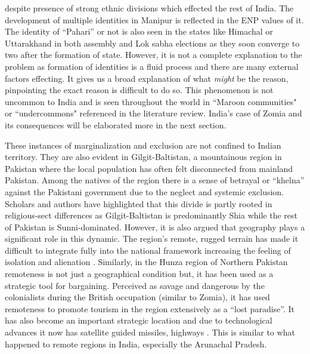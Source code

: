 despite presence of strong ethnic divisions which effected the rest of India. 
The development of multiple identities in Manipur is reflected in the ENP values of it. The identity of ``Pahari'' or not is also seen in the states like Himachal or Uttarakhand in both assembly and Lok sabha elections as they soon converge to two after the formation of state. However, it is not a complete explanation to the problem as formation of identities is a fluid process and there are many external factors effecting. It gives us a broad explanation of what \textit{might} be the reason, pinpointing the exact reason is difficult to do so.
This phenomenon is not uncommon to India and is seen throughout the world in ``Maroon communities"  or ``undercommons" referenced in the literature review. India's case of Zomia and its consequences will be elaborated more in the next section. 



 \vspace{0.3cm}

 These instances of marginalization and exclusion are not confined to Indian territory. They are also evident in Gilgit-Baltistan, a mountainous region in Pakistan where the local population has often felt disconnected from mainland Pakistan. Among the natives of the region there is a sense of betrayal or \enquote{khelna} against the Pakistani government due to the neglect and systemic exclusion. Scholars and authors have highlighted that this divide is partly rooted in religious-sect differences as Gilgit-Baltistan is predominantly Shia while the rest of Pakistan is  Sunni-dominated. However, it is also argued that geography plays a significant role in this dynamic. The region's remote, rugged terrain has  made it difficult to integrate fully into the national framework  increasing the feeling of isolation and alienation \citep{ali2019delusional}. Similarly, in the Hunza region of Northern Pakistan  remoteness is not just a geographical condition but, it has been used as a strategic tool for bargaining. Perceived as savage and dangerous by the colonialists during the British occupation (similar to Zomia), it has used remoteness to promote tourism in the region extensively as a \enquote{lost paradise}. It has also become an important strategic location and due to technological  advances it now has satellite guided missiles, highways \citep{hussain2015remoteness}. This is similar to what happened to remote regions in India, especially the Arunachal Pradesh.

\vspace{0.3cm}

